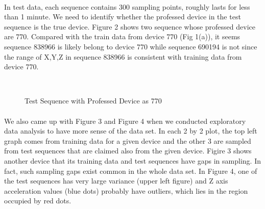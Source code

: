 \documentclass{article}
\begin{document}
	\paragraph{}In test data, each sequence contains 300 sampling points, roughly lasts for less than 1 minute. We need to identify whether the professed device in the test sequence is the true device. Figure 2 shows two sequence whose professed device are 770. Compared with the train data from device 770 (Fig 1(a)), it seems sequence 838966 is likely belong to device 770 while sequence 690194 is not since the range of X,Y,Z in sequence 838966 is consistent with training data from device 770. 
	\begin{figure}
		\centering
		\\
		\caption{Test Sequence with Professed Device as 770}
	\end{figure}
	
	\paragraph{} We also came up with Figure 3 and Figure 4 when we conducted exploratory data analysis to have more sense of the data set. In each 2 by 2 plot, the top left graph comes from training data for a given device and the other 3 are sampled from test sequences that are claimed also from the given device. Figire 3 shows another device that its training data and test sequences have gaps in sampling. In fact, such sampling gaps exist common in the whole data set. In Figure 4, one of the test sequences has very large variance (upper left figure) and Z axis acceleration values (blue dots) probably have outliers, which lies in the region occupied by red dots.
	
\end{document}
